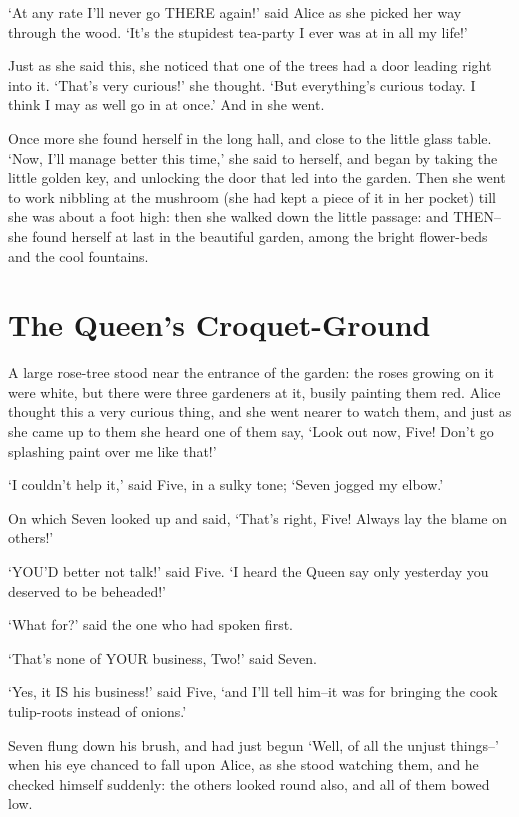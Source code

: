 \documentclass[12pt]{book}
\begin{document}
  `At any rate I'll never go THERE again!' said Alice as she
picked her way through the wood.  `It's the stupidest tea-party I
ever was at in all my life!'

  Just as she said this, she noticed that one of the trees had a
door leading right into it.  `That's very curious!' she thought.
`But everything's curious today.  I think I may as well go in at once.'
And in she went.

  Once more she found herself in the long hall, and close to the
little glass table.  `Now, I'll manage better this time,'
she said to herself, and began by taking the little golden key,
and unlocking the door that led into the garden.  Then she went
to work nibbling at the mushroom (she had kept a piece of it
in her pocket) till she was about a foot high:  then she walked down
the little passage:  and THEN--she found herself at last in the
beautiful garden, among the bright flower-beds and the cool fountains.

\chapter{The Queen's Croquet-Ground}

  A large rose-tree stood near the entrance of the garden:  the
roses growing on it were white, but there were three gardeners at
it, busily painting them red.  Alice thought this a very curious
thing, and she went nearer to watch them, and just as she came up
to them she heard one of them say, `Look out now, Five!  Don't go
splashing paint over me like that!'

  `I couldn't help it,' said Five, in a sulky tone; `Seven jogged
my elbow.'

  On which Seven looked up and said, `That's right, Five!  Always
lay the blame on others!'

  `YOU'D better not talk!' said Five.  `I heard the Queen say only
yesterday you deserved to be beheaded!'

  `What for?' said the one who had spoken first.

  `That's none of YOUR business, Two!' said Seven.

  `Yes, it IS his business!' said Five, `and I'll tell him--it
was for bringing the cook tulip-roots instead of onions.'

  Seven flung down his brush, and had just begun `Well, of all
the unjust things--' when his eye chanced to fall upon Alice, as
she stood watching them, and he checked himself suddenly:  the
others looked round also, and all of them bowed low.
\end{document}
